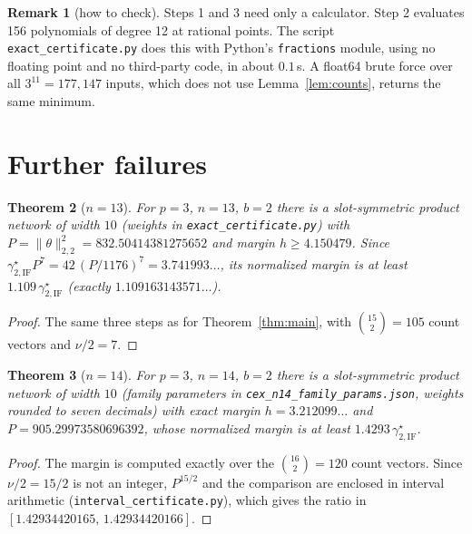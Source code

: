 \documentclass[11pt]{article}
\newtheorem{theorem}{Theorem}
\theoremstyle{definition}
\newtheorem{remark}[theorem]{Remark}
\begin{document}
\begin{remark}[how to check]
Steps 1 and 3 need only a calculator. Step 2 evaluates 156 polynomials of degree 12 at rational points.
The script \texttt{exact\_certificate.py} does this with Python's \texttt{fractions} module, using no floating
point and no third-party code, in about $0.1$\,s. A float64 brute force over all $3^{11}=177{,}147$ inputs, which does
not use Lemma~\ref{lem:counts}, returns the same minimum.
\end{remark}

\section{Further failures}

\begin{theorem}[$n=13$]\label{thm:n13}
For $p=3$, $n=13$, $b=2$ there is a slot-symmetric product network of width $10$
(weights in \texttt{exact\_certificate.py}) with $P=\|\theta\|_{2,2}^2=832.50414381275652$ and margin
$h\ge4.150479$. Since $\gamma^\star_{2,\mathrm{IF}}P^7=42\,(P/1176)^7=3.741993\ldots$, its normalized margin is at least
$1.109\,\gamma^\star_{2,\mathrm{IF}}$ (exactly $1.109163143571\ldots$).
\end{theorem}
\begin{proof}
The same three steps as for Theorem~\ref{thm:main}, with $\binom{15}{2}=105$ count vectors and $\nu/2=7$.
\end{proof}

\begin{theorem}[$n=14$]\label{thm:n14}
For $p=3$, $n=14$, $b=2$ there is a slot-symmetric product network of width $10$ (family parameters in
\texttt{cex\_n14\_family\_params.json}, weights rounded to seven decimals) with exact margin $h=3.212099\ldots$ and
$P=905.29973580696392$, whose normalized margin is at least $1.4293\,\gamma^\star_{2,\mathrm{IF}}$.
\end{theorem}
\begin{proof}
The margin is computed exactly over the $\binom{16}{2}=120$ count vectors. Since $\nu/2=15/2$ is not an integer,
$P^{15/2}$ and the comparison are enclosed in interval arithmetic (\texttt{interval\_certificate.py}), which gives
the ratio in $[1.42934420165,\,1.42934420166]$.
\end{proof}
\end{document}
